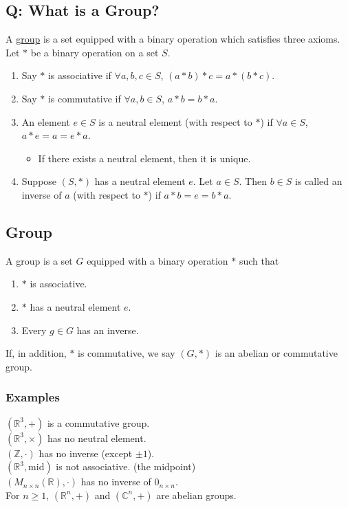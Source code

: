 \documentclass[11pt]{article}
\newcommand{\0}{\emptyset}
\newcommand{\Z}{\mathbb{Z}}
\newcommand{\R}{\mathbb{R}}
\newcommand{\C}{\mathbb{C}}
\begin{document}
\subsection*{Q: What is a Group?}
\label{sec:orgf41cf08}
A \href{../Definitions/group.org}{group} is a set equipped with a binary operation which satisfies three axioms.\\[0pt]
Let \(*\) be a binary operation on a set \(S\).\\[0pt]
\begin{enumerate}
\item Say \(*\) is associative if \(\forall a,b,c\in S\), \((a*b)*c=a*(b*c)\).\\[0pt]
\item Say \(*\) is commutative if \(\forall a,b\in S\), \(a*b=b*a\).\\[0pt]
\item An element \(e\in S\) is a neutral element (with respect to \(*\)) if \(\forall a\in S\), \(a*e=a=e*a\).\\[0pt]
\begin{itemize}
\item If there exists a neutral element, then it is unique.\\[0pt]
\end{itemize}
\item Suppose \((S,*)\) has a neutral element \(e\). Let \(a\in S\). Then \(b\in S\) is called an inverse of \(a\) (with respect to \(*\)) if \(a*b=e=b*a\).\\[0pt]
\end{enumerate}
\subsection*{Group}
\label{sec:org3072b24}
A group is a set \(G\) equipped with a binary operation \(*\) such that\\[0pt]
\begin{enumerate}
\item \(*\) is associative.\\[0pt]
\item \(*\) has a neutral element \(e\).\\[0pt]
\item Every \(g\in G\) has an inverse.\\[0pt]
\end{enumerate}
If, in addition, \(*\) is commutative, we say \((G,*)\) is an abelian or commutative group.\\[0pt]
\subsubsection*{Examples}
\label{sec:orgd160984}
\((\R^{3},+)\) is a commutative group.\\[0pt]
\((\R^{3},\times)\) has no neutral element.\\[0pt]
\((\Z,\cdot)\) has no inverse (except \(\pm 1\)).\\[0pt]
\((\R^{3},\text{mid})\) is not associative. (the midpoint)\\[0pt]
\((M_{n\times n}(\R),\cdot)\) has no inverse of \(0_{n\times n}\).\\[0pt]
For \(n\geq 1\), \((\R^{n},+)\) and \((\C^{n},+)\) are abelian groups.\\[0pt]
\end{document}
